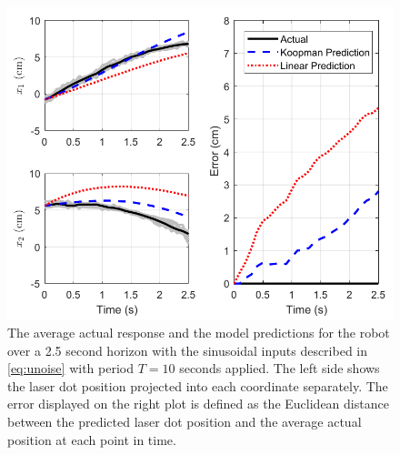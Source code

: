 \begin{figure}
    \centering
    \includegraphics[width=\linewidth]{figures/predictionComparison_v3.pdf}
    \caption{The average actual response and the model predictions for the robot over a 2.5 second horizon with the sinusoidal inputs described in \eqref{eq:unoise} with period $T = 10$ seconds applied. The left side shows the laser dot position projected into each coordinate separately. The error displayed on the right plot is defined as the Euclidean distance between the predicted laser dot position and the average actual position at each point in time.}
    \label{fig:predict}
\end{figure}

